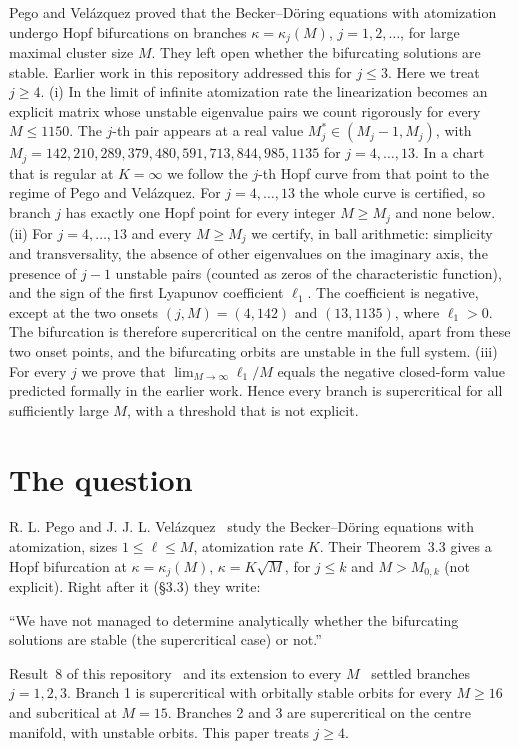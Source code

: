 \documentclass[11pt,a4paper]{report}
\begin{document}
\makepapertitle

\begin{paperabstract}
Pego and Velázquez proved that the Becker--Döring equations with atomization undergo Hopf bifurcations on branches
\(\kappa=\kappa_j(M)\), \(j=1,2,\dots\), for large maximal cluster size \(M\). They left open whether the bifurcating
solutions are stable. Earlier work in this repository addressed this for \(j\le3\). Here we treat \(j\ge4\).
(i) In the limit of infinite atomization rate the linearization becomes an explicit matrix whose unstable eigenvalue
pairs we count rigorously for every \(M\le1150\). The \(j\)-th pair appears at a real value \(M^*_j\in(M_j-1,M_j)\), with
\(M_j=142,210,289,379,480,591,713,844,985,1135\) for \(j=4,\dots,13\). In a chart that is regular at \(K=\infty\) we
follow the \(j\)-th Hopf curve from that point to the regime of Pego and Velázquez. For \(j=4,\dots,13\) the whole
curve is certified, so branch \(j\) has exactly one Hopf point for every integer \(M\ge M_j\) and none below.
(ii) For \(j=4,\dots,13\) and every \(M\ge M_j\) we certify, in ball arithmetic: simplicity and transversality, the
absence of other eigenvalues on the imaginary axis, the presence of \(j-1\) unstable pairs (counted as zeros of the
characteristic function), and the sign of the first Lyapunov coefficient \(\ell_1\). The coefficient is negative,
except at the two onsets \((j,M)=(4,142)\) and \((13,1135)\), where \(\ell_1>0\). The bifurcation is therefore
supercritical on the centre manifold, apart from these two onset points, and the bifurcating orbits are unstable in
the full system.
(iii) For every \(j\) we prove that \(\lim_{M\to\infty}\ell_1/M\) equals the negative closed-form value predicted
formally in the earlier work. Hence every branch is supercritical for all sufficiently large \(M\), with a threshold
that is not explicit.
\end{paperabstract}

\section*{The question}

R. L. Pego and J. J. L. Velázquez~\autocite{PV2020} study the Becker--Döring equations with atomization, sizes
\(1\le\ell\le M\), atomization rate \(K\). Their Theorem~3.3 gives a Hopf bifurcation at \(\kappa=\kappa_j(M)\),
\(\kappa=K\sqrt M\), for \(j\le k\) and \(M>M_{0,k}\) (not explicit). Right after it (§3.3) they write:
\begin{openquote}
``We have not managed to determine analytically whether the bifurcating solutions are stable (the supercritical case)
or not.''
\end{openquote}
Result~8 of this repository~\autocite{Result8} and its extension to every \(M\)~\autocite{AllM} settled branches
\(j=1,2,3\). Branch 1 is supercritical with orbitally stable orbits for every \(M\ge16\) and subcritical at \(M=15\).
Branches 2 and 3 are supercritical on the centre manifold, with unstable orbits. This paper treats \(j\ge4\).
\end{document}
